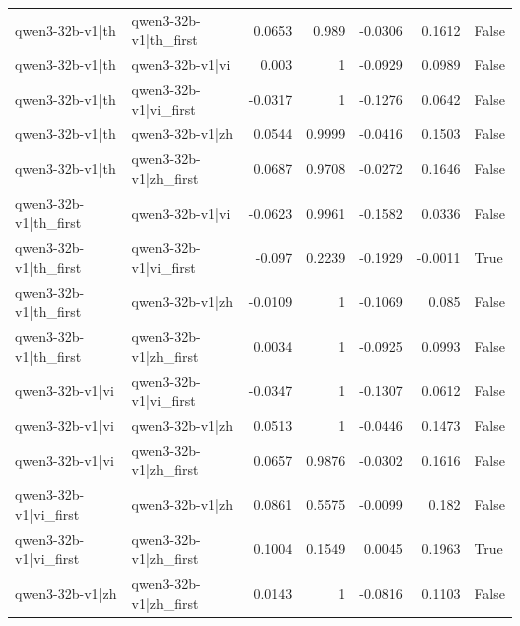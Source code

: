 \begin{table}
\begin{tabular}{l l r r r r l}
qwen3-32b-v1|th & qwen3-32b-v1|th_first & 0.0653 & 0.989 & -0.0306 & 0.1612 & False \\
qwen3-32b-v1|th & qwen3-32b-v1|vi & 0.003 & 1 & -0.0929 & 0.0989 & False \\
qwen3-32b-v1|th & qwen3-32b-v1|vi_first & -0.0317 & 1 & -0.1276 & 0.0642 & False \\
qwen3-32b-v1|th & qwen3-32b-v1|zh & 0.0544 & 0.9999 & -0.0416 & 0.1503 & False \\
qwen3-32b-v1|th & qwen3-32b-v1|zh_first & 0.0687 & 0.9708 & -0.0272 & 0.1646 & False \\
qwen3-32b-v1|th_first & qwen3-32b-v1|vi & -0.0623 & 0.9961 & -0.1582 & 0.0336 & False \\
qwen3-32b-v1|th_first & qwen3-32b-v1|vi_first & -0.097 & 0.2239 & -0.1929 & -0.0011 & True \\
qwen3-32b-v1|th_first & qwen3-32b-v1|zh & -0.0109 & 1 & -0.1069 & 0.085 & False \\
qwen3-32b-v1|th_first & qwen3-32b-v1|zh_first & 0.0034 & 1 & -0.0925 & 0.0993 & False \\
qwen3-32b-v1|vi & qwen3-32b-v1|vi_first & -0.0347 & 1 & -0.1307 & 0.0612 & False \\
qwen3-32b-v1|vi & qwen3-32b-v1|zh & 0.0513 & 1 & -0.0446 & 0.1473 & False \\
qwen3-32b-v1|vi & qwen3-32b-v1|zh_first & 0.0657 & 0.9876 & -0.0302 & 0.1616 & False \\
qwen3-32b-v1|vi_first & qwen3-32b-v1|zh & 0.0861 & 0.5575 & -0.0099 & 0.182 & False \\
qwen3-32b-v1|vi_first & qwen3-32b-v1|zh_first & 0.1004 & 0.1549 & 0.0045 & 0.1963 & True \\
qwen3-32b-v1|zh & qwen3-32b-v1|zh_first & 0.0143 & 1 & -0.0816 & 0.1103 & False \\
\bottomrule
\end{tabular}
\end{table}
